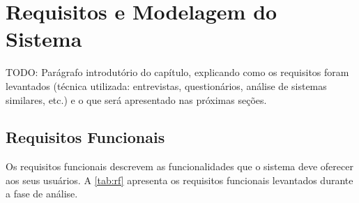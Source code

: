 %
%

\chapter{Requisitos e Modelagem do Sistema}
\label{cap:requisitos}

TODO: Parágrafo introdutório do capítulo, explicando como os requisitos
foram levantados (técnica utilizada: entrevistas, questionários, análise
de sistemas similares, etc.) e o que será apresentado nas próximas seções.


\section{Requisitos Funcionais}
\label{sec:requisitos-funcionais}

Os requisitos funcionais descrevem as funcionalidades que o sistema deve
oferecer aos seus usuários. A \cref{tab:rf} apresenta os requisitos
funcionais levantados durante a fase de análise.


